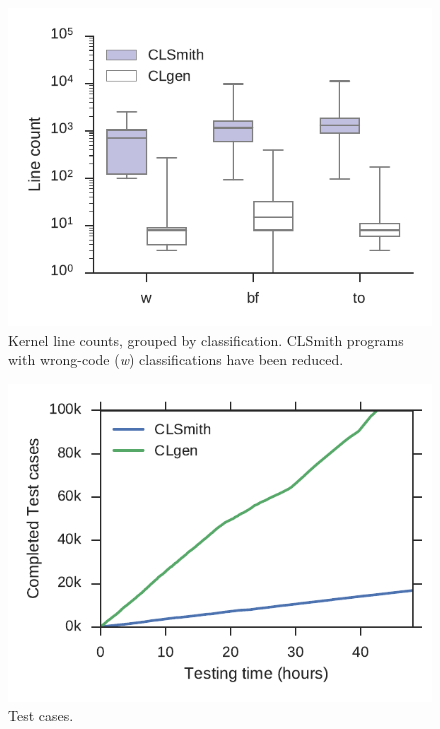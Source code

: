\begin{figure}
	\centering %
	\includegraphics[width=\columnwidth]{build/img/kernel-sizes}%
	\caption{%
		Kernel line counts, grouped by classification. CLSmith programs with wrong-code (\emph{w}) classifications have been reduced.%
	}%
	\label{fig:kernel-sizes} %
\end{figure}


\begin{figure}
	\centering %
	\includegraphics[width=\columnwidth]{build/img/total-tests}%
	\caption{%
		Test cases. %
	}%
	\label{fig:total-tests} %
\end{figure}
